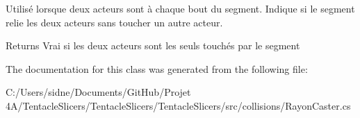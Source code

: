 Utilisé lorsque deux acteurs sont à chaque bout du segment. Indique si le segment relie les deux acteurs sans toucher un autre acteur. 

\begin{DoxyReturn}{Returns}
Vrai si les deux acteurs sont les seuls touchés par le segment 
\end{DoxyReturn}


The documentation for this class was generated from the following file\+:\begin{DoxyCompactItemize}
\item 
C\+:/\+Users/sidne/\+Documents/\+Git\+Hub/\+Projet 4\+A/\+Tentacle\+Slicers/\+Tentacle\+Slicers/\+Tentacle\+Slicers/src/collisions/Rayon\+Caster.\+cs\end{DoxyCompactItemize}
